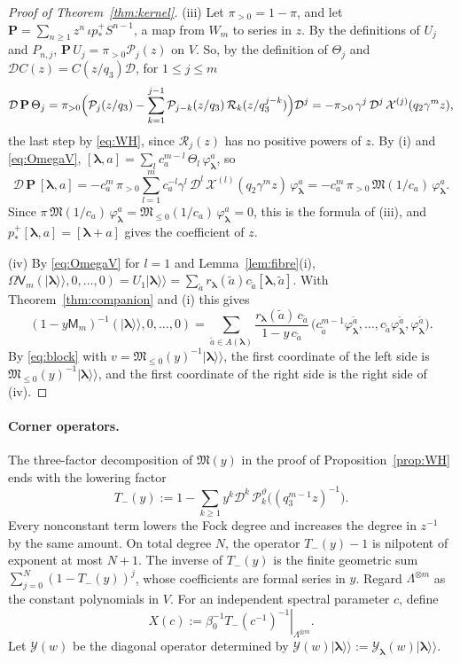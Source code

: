 \documentclass[11pt]{amsart}
\theoremstyle{definition}
\theoremstyle{remark}
\newcommand{\betaz}{\beta_0}                     %
\newcommand{\La}{\Lambda}                        %
\newcommand{\bl}{{\boldsymbol{\lambda}}}         %
\newcommand{\Add}[1]{A(#1)}                      %
\newcommand{\CY}{\mathcal Y}
\newcommand{\Yfn}[1]{\CY_{#1}}                   %
\newcommand{\res}[2]{r_{#1}(#2)}                 %
\newcommand{\ceig}[1]{c_{#1}}                    %
\newcommand{\Wsp}[1]{W_{#1}}                     %
\newcommand{\kket}[1]{\lvert #1\rangle\!\rangle} %
\newcommand{\fix}[1]{[#1]}                       %
\newcommand{\pt}[2]{[#1,#2]}                     %
\newcommand{\pushp}{p^+_*}                       %
\newcommand{\Shift}{S}                           %
\newcommand{\Omap}{\Omega}                       %
\newcommand{\Hiso}{\iota}                        %
\newcommand{\DD}{\mathcal D}
\newcommand{\Pser}[1]{\mathcal P_{#1}}           %
\newcommand{\Xk}[1]{\mathcal X^{(#1)}}           %
\newcommand{\MM}{\mathsf M}
\newcommand{\Miura}[1]{\MM_{#1}}                 %
\newcommand{\VV}{\mathsf V}
\newcommand{\Vconj}[1]{\VV_{#1}}                 %
\newcommand{\Rlast}[1]{\mathcal R_{#1}}          %
\newcommand{\Miuraop}{\mathfrak M}               %
\newcommand{\Miuraproj}{\Miuraop_{\leq0}}         %
\newcommand{\Meig}[2]{\varphi_{#1}^{#2}}         %
\begin{document}
\begin{proof}[Proof of Theorem~\ref{thm:kernel}]
(iii) Let \(\pi_{>0}=1-\pi\), and let
\(\mathbf P=\sum_{n\geq1}z^n\,\Hiso\pushp\Shift^{n-1}\), a map from \(\Wsp{m}\) to series in \(z\). By the
definitions of \(U_j\) and \(P_{n,j}\), \(\mathbf P\,U_j=\pi_{>0}\Pser{j}(z)\) on \(V\). So, by the definition of
\(\Theta_j\) and \(\DD C(z)=C(z/q_3)\DD\), for \(1\leq j\leq m\)
\[
 \DD\,\mathbf P\,\Theta_j
 =\pi_{>0}\Bigl(\Pser{j}(z/q_3)-\sum_{k=1}^{j-1}\Pser{j-k}(z/q_3)\,\Rlast{k}(z/q_3^{j-k})\Bigr)\DD^j
 =-\pi_{>0}\,\gamma^j\,\DD^j\,\Xk{j}(q_2\gamma^mz),
\]
the last step by \eqref{eq:WH}, since \(\Rlast{j}(z)\) has no positive powers of \(z\). By (i) and
\eqref{eq:OmegaV}, \(\pt{\bl}{a}=\sum_l\ceig{a}^{m-l}\,\Theta_l\,\Meig{\bl}{a}\), so
\[
 \DD\,\mathbf P\,\pt{\bl}{a}
 =-\ceig{a}^m\,\pi_{>0}\sum_{l=1}^m\ceig{a}^{-l}\gamma^l\,\DD^l\,\Xk{l}(q_2\gamma^mz)\,\Meig{\bl}{a}
 =-\ceig{a}^m\,\pi_{>0}\,\Miuraop(1/\ceig{a})\,\Meig{\bl}{a}.
\]
Since \(\pi\,\Miuraop(1/\ceig{a})\,\Meig{\bl}{a}=\Miuraproj(1/\ceig{a})\,\Meig{\bl}{a}=0\), this is the formula of
(iii), and \(\pushp\pt{\bl}{a}=\fix{\bl+a}\) gives the coefficient of \(z\).

(iv) By \eqref{eq:OmegaV} for \(l=1\) and Lemma~\ref{lem:fibre}(i),
\(\Omap\Vconj{m}(\kket{\bl},0,\dots,0)=U_1\kket{\bl}=\sum_{\tilde a}\res{\bl}{\tilde a}\ceig{\tilde a}\pt{\bl}{\tilde a}\).
With Theorem~\ref{thm:companion} and (i) this gives
\[
 (1-y\Miura{m})^{-1}(\kket{\bl},0,\dots,0)
 =\sum_{\tilde a\in\Add{\bl}}\frac{\res{\bl}{\tilde a}\,\ceig{\tilde a}}{1-y\,\ceig{\tilde a}}\,
 \bigl(\ceig{\tilde a}^{m-1}\Meig{\bl}{\tilde a},\dots,\ceig{\tilde a}\Meig{\bl}{\tilde a},\Meig{\bl}{\tilde a}\bigr).
\]
By \eqref{eq:block} with \(v=\Miuraproj(y)^{-1}\kket{\bl}\), the first coordinate of the left side is
\(\Miuraproj(y)^{-1}\kket{\bl}\), and the first coordinate of the right side is the right side of (iv).
\end{proof}

\paragraph{Corner operators.}
The three-factor decomposition of \(\Miuraop(y)\) in the proof of
Proposition~\ref{prop:WH} ends with the lowering factor
\[
 T_-(y):=1-\sum_{k\geq1}y^k\DD^k\,
 \Pser{k}^\vartheta\bigl((q_3^{m-1}z)^{-1}\bigr).
\]
Every nonconstant term lowers the Fock degree and increases the degree in \(z^{-1}\)
by the same amount. On total degree \(N\), the operator \(T_-(y)-1\) is nilpotent
of exponent at most \(N+1\). The inverse of \(T_-(y)\) is the finite geometric sum
\(\sum_{j=0}^N(1-T_-(y))^j\), whose coefficients are formal series in \(y\).
Regard \(\La^{\otimes m}\) as the constant polynomials in \(V\).
For an independent spectral parameter \(c\), define
\begin{equation}\label{eq:corneroperator}
 X(c):=\left.\betaz^{-1}T_-(c^{-1})^{-1}\right|_{\La^{\otimes m}}.
\end{equation}
Let \(\CY(w)\) be the diagonal operator determined by
\(\CY(w)\kket{\bl}:=\Yfn{\bl}(w)\kket{\bl}\).
\end{document}
